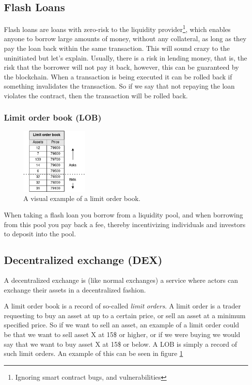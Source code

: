 \subsection{Flash Loans}
Flash loans are loans with zero-risk to the liquidity provider\footnote{Ignoring
smart contract bugs, and vulnerabilities}, which enables anyone to borrow large
amounts of money, without any collateral, as long as they pay the loan
back within the same transaction. This will sound crazy to the uninitiated but
let's explain. Usually, there is a risk in lending money, that is, the risk that
the borrower will not pay it back, however, this can be guaranteed by the
blockchain. When a transaction is being executed it can be rolled back if
something invalidates the transaction. So if we say that not repaying the loan
violates the contract, then the transaction will be rolled back.\\
\subsubsection{Limit order book (LOB)}
\begin{figure}
  \centering
  \includegraphics[width=0.3\textwidth]{assests/Flash-loans-LOB}
  \caption{A visual example of a limit order book.}
  \label{fig:LOB}
\end{figure}
When taking a flash loan you borrow from a liquidity pool, and when borrowing
from this pool you pay back a fee, thereby incentivizing individuals and
investors to deposit into the pool.

\subsection{Decentralized exchange (DEX)}
A decentralized exchange is (like normal exchanges) a service where actors can
exchange their assets in a decentralized fashion.

A limit order book is a record of so-called \textit{limit orders}. A limit order
is a trader requesting to buy an asset at up to a certain price, or sell an
asset at a minimum specified price. So if we want to sell an asset, an example of
a limit order could be that we want to sell asset X at 15\$ or higher, or if we
were buying we would say that we want to buy asset X at 15\$ or below. A LOB is
simply a record of such limit orders. An example of this can be seen in figure
\ref{fig:LOB}

